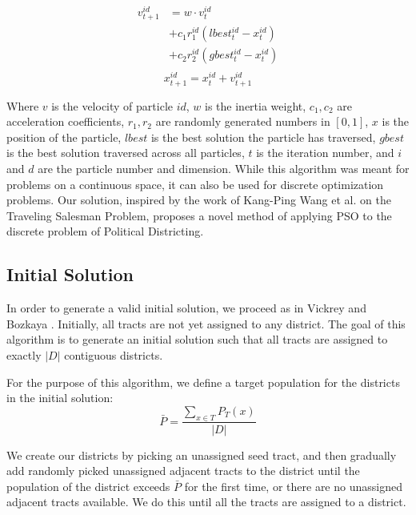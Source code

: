 \documentclass[journal]{IEEEtran}
\begin{document}
\begin{equation}
\label{vel-update-eqn-classic}
\begin{aligned}
v_{t + 1}^{id} &= w \cdot v_t^{id}\\
&+ c_1r_1^{id}(lbest_t^{id} - x_t^{id})\\
&+ c_2r_2^{id}(gbest_t^{id} - x_t^{id})\\
\end{aligned}
\end{equation}
\begin{equation}
\label{pos-update-eqn-classic}
x_{t + 1}^{id} = x_t^{id} + v_{t + 1}^{id}
\end{equation}

Where $v$ is the velocity of particle $id$, $w$ is the inertia weight, $c_1,
c_2$ are acceleration coefficients, $r_1, r_2$ are randomly generated numbers in
$[0, 1]$, $x$ is the position of the particle, $lbest$ is the best solution the
particle has traversed, $gbest$ is the best solution traversed across all
particles, $t$ is the iteration number, and $i$ and $d$ are the particle number
and dimension.  While this algorithm was meant for problems on a continuous
space, it can also be used for discrete optimization problems.  Our solution,
inspired by the work of Kang-Ping Wang et al. \cite{tsp-pso} on the Traveling
Salesman Problem, proposes a novel method of applying PSO to the discrete
problem of Political Districting.

\subsection{Initial Solution}
In order to generate a valid initial solution, we proceed as in Vickrey
\cite{initial} and Bozkaya \cite{local-search}.  Initially, all tracts are not
yet assigned to any district. The goal of this algorithm is to generate an
initial solution such that all tracts are assigned to exactly $|D|$ contiguous
districts.

For the purpose of this algorithm, we define a target population for the
districts in the initial solution:
$$\bar{P} = \frac{\sum_{x \in T} P_T(x)}{|D|}$$

We create our districts by picking an unassigned seed tract, and then gradually
add randomly picked unassigned adjacent tracts to the district until the
population of the district exceeds $\bar{P}$ for the first time, or there are no
unassigned adjacent tracts available. We do this until all the tracts are
assigned to a district.
\end{document}
